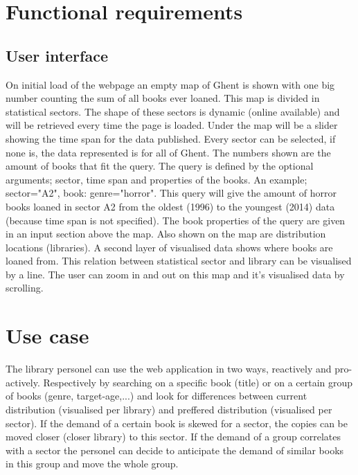 \section{Functional requirements}

\subsection{User interface}

On initial load of the webpage an empty map of Ghent is shown with one big number counting the sum of all books ever loaned. This map is divided in statistical sectors. The shape of these sectors is dynamic (online available) and will be retrieved every time the page is loaded. Under the map will be a slider showing the time span for the data published. Every sector can be selected, if none is, the data represented is for all of Ghent.  The numbers shown are the amount of books that fit the query. The query is defined by the optional arguments; sector, time span and properties of the books. An example; sector="A2", book: genre="horror". This query will give the amount of horror books loaned in sector A2 from the oldest (1996) to the youngest (2014) data (because time span is not specified). The book properties of the query are given in an input section above the map. Also shown on the map are distribution locations (libraries). A second layer of visualised data shows where books are loaned from. This relation between statistical sector and library can be visualised by a line. The user can zoom in and out on this map and it's visualised data by scrolling. 

\section{Use case}

The library personel can use the web application in two ways, reactively and pro-actively. Respectively by searching on a specific book (title) or on a certain group of books (genre, target-age,...) and look for differences between current distribution (visualised per library) and preffered distribution (visualised per sector). If the demand of a certain book is skewed for a sector, the copies can be moved closer (closer library) to this sector. If the demand of a group correlates with a sector the personel can decide to anticipate the demand of similar books in this group and move the whole group. 
